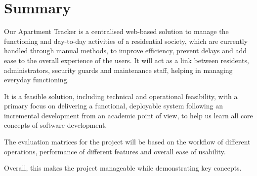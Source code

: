 \documentclass[11pt,a4paper]{article}
\begin{document}

\section{Summary}

Our Apartment Tracker is a centralised web-based solution to manage the functioning and day-to-day activities of a residential society, which are currently handled through manual methods, to improve efficiency, prevent delays and add ease to the overall experience of the users. It will act as a link between residents, administrators, security guards and maintenance staff, helping in managing everyday functioning.

It is a feasible solution, including technical and operational feasibility, with a primary focus on delivering a functional, deployable system following an incremental development from an academic point of view, to help us learn all core concepts of software development.

The evaluation matrices for the project will be based on the workflow of different operations, performance of different features and overall ease of usability.

Overall, this makes the project manageable while demonstrating key concepts.
\end{document}
